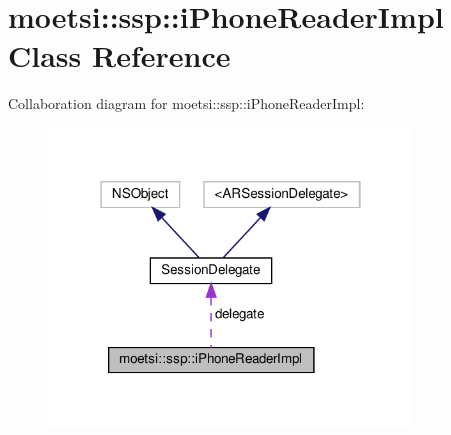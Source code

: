 \hypertarget{classmoetsi_1_1ssp_1_1iPhoneReaderImpl}{}\section{moetsi\+:\+:ssp\+:\+:i\+Phone\+Reader\+Impl Class Reference}
\label{classmoetsi_1_1ssp_1_1iPhoneReaderImpl}


Collaboration diagram for moetsi\+:\+:ssp\+:\+:i\+Phone\+Reader\+Impl\+:\nopagebreak
\begin{figure}[H]
\begin{center}
\leavevmode
\includegraphics[width=274pt]{classmoetsi_1_1ssp_1_1iPhoneReaderImpl__coll__graph}
\end{center}
\end{figure}
